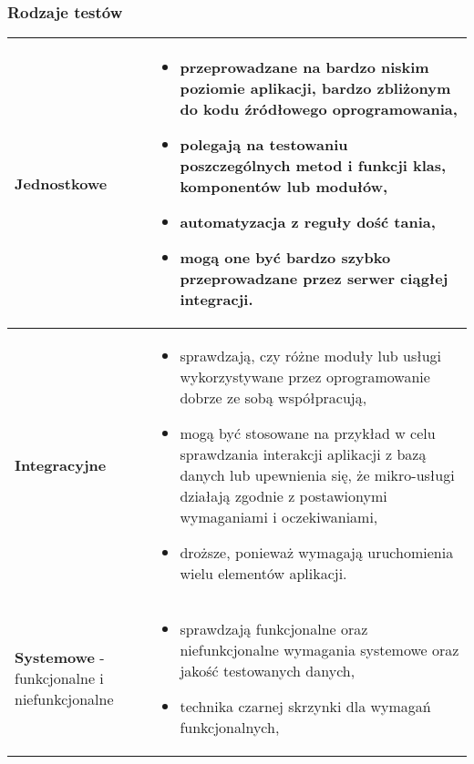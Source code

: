 \documentclass[../main.tex]{subfiles}
\begin{document}
    \subsubsection{Rodzaje testów}
    \begin{table}[H]
        \begin{center}
            \begin{tabular}{ p{5cm} p{11cm} }
                \textbf{Jednostkowe}
                &
                \begin{itemize}
                    \item przeprowadzane na bardzo niskim poziomie aplikacji, bardzo zbliżonym
                    do kodu źródłowego oprogramowania,
                    \item polegają na testowaniu poszczególnych metod i funkcji
                    klas, komponentów lub modułów,
                    \item automatyzacja z reguły dość tania,
                    \item mogą one być bardzo szybko przeprowadzane przez serwer
                    ciągłej integracji.
                \end{itemize}
                \\

                \toprule

                \textbf{Integracyjne}
                &
                \begin{itemize}
                    \item sprawdzają, czy różne moduły lub usługi wykorzystywane przez oprogramowanie
                    dobrze ze sobą współpracują,
                    \item mogą być stosowane na przykład w celu sprawdzania
                    interakcji aplikacji z bazą danych lub upewnienia się, że mikro-usługi działają zgodnie z
                    postawionymi wymaganiami i oczekiwaniami,
                    \item droższe, ponieważ
                    wymagają uruchomienia wielu elementów aplikacji.
                \end{itemize}
                \\

                \toprule

                \textbf{Systemowe} - funkcjonalne i niefunkcjonalne
                &
                \begin{itemize}
                    \item sprawdzają funkcjonalne oraz niefunkcjonalne wymagania systemowe oraz jakość
                    testowanych danych,
                    \item technika czarnej skrzynki dla wymagań funkcjonalnych,
                \end{itemize}
                \\


\end{tabular}
\end{center}
\end{table}
\end{document}
